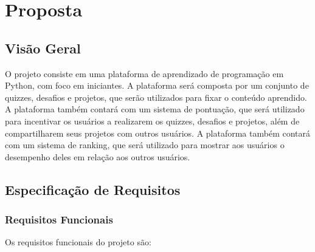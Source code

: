 \chapter{Proposta}

\section{Visão Geral}

O projeto consiste em uma plataforma de aprendizado de programação em Python, com foco em iniciantes. A plataforma será composta por um conjunto de quizzes, desafios e projetos, que serão utilizados para fixar o conteúdo aprendido. A plataforma também contará com um sistema de pontuação, que será utilizado para incentivar os usuários a realizarem os quizzes, desafios e projetos, além de compartilharem seus projetos com outros usuários. A plataforma também contará com um sistema de ranking, que será utilizado para mostrar aos usuários o desempenho deles em relação aos outros usuários.

\section{Especificação de Requisitos}

\subsection{Requisitos Funcionais}

Os requisitos funcionais do projeto são:

